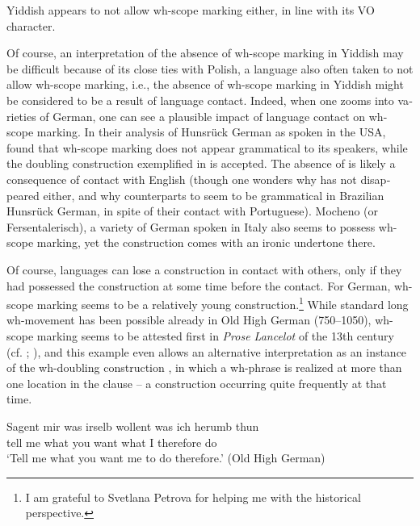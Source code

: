 \documentclass[output=paper,colorlinks,citecolor=brown]{langscibook}
\begin{document}
\begin{otherlanguage}{english}
Yiddish appears to not allow wh-scope marking either, in line with its VO character.

    \label{ex:fanselow:6}
    \z

\noindent Of course, an interpretation of the absence of wh-scope marking in Yiddish may be difficult because of its close ties with Polish, a language also often taken to not allow wh-scope marking, i.e., the absence of wh-scope marking in Yiddish might be considered to be a result of language contact. Indeed, when one zooms into varieties of German, one can see a plausible impact of language contact on wh-scope marking. In their analysis of Hunsrück German as spoken in the USA, \citet{Hopp-Putnam-etal2019} found that wh-scope marking does not appear grammatical to its speakers, while the doubling construction exemplified in  is accepted. The absence of  is likely a consequence of contact with English (though one wonders why  has not disappeared either, and why counterparts to  seem to be grammatical in Brazilian Hunsrück German, in spite of their contact with Portuguese). Mocheno (or Fersentalerisch), a variety of German spoken in Italy also seems to possess wh-scope marking, yet the construction comes with an ironic undertone there.

Of course, languages can lose a construction in contact with others, only if they had possessed the construction at some time before the contact. For German, wh-scope marking seems to be a relatively young construction.\footnote{I am grateful to Svetlana Petrova for helping me with the historical perspective.
} While standard long wh-movement has been possible already in Old High German (750--1050), wh-scope marking seems to be attested first in \textit{Prose Lancelot} of the 13th century (cf. ; \citealt[81]{Axel-Tober2012}), and this example even allows an alternative interpretation as an instance of the wh-doubling construction , in which a wh-phrase is realized at more than one location in the clause -- a construction occurring quite frequently at that time.

\ea \label{ex:fanselow:7}
\gll  Sagent	mir 	was 	irselb 	wollent 	was 	ich 	herumb 	thun  \\
    tell	me	what	you	want	what	I	therefore	do \\
    \glt    ‘Tell me what you want me to do therefore.' \hfill (Old High German)
    \z


\end{otherlanguage}
\end{document}
